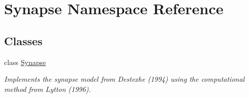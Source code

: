 \hypertarget{namespace_synapse}{}\section{Synapse Namespace Reference}
\label{namespace_synapse}
\subsection*{Classes}
\begin{DoxyCompactItemize}
\item 
class \hyperlink{class_synapse_1_1_synapse}{Synapse}
\begin{DoxyCompactList}\small\item\em Implements the synapse model from Destexhe (1994) using the computational method from Lytton (1996). \end{DoxyCompactList}\end{DoxyCompactItemize}
